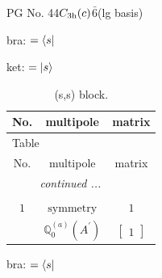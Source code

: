 \documentclass[fleqn,8pt,landscape]{jsarticle}
\begin{document}
\setcounter{MaxMatrixCols}{32}

\renewcommand{\tablename}{Table~}
\renewcommand{\figurename}{Figure~}
\begin{center}
\LARGE
PG No. 44\quad$C_{\rm 3h}(c)$\quad$\bar{6}$\quad[ hexagonal ] (lg basis)
\end{center}
bra: $=\bra{s}$

\noindent
ket: $=\ket{s}$
\renewcommand{\arraystretch}{1.6}
\begin{longtable}{ccc}
\caption{(s,s) block.}
 \\
 \hline \hline
No. & multipole & matrix \\ \hline \endfirsthead

\multicolumn{2}{l}{\tablename\ \thetable{}} \\
 \hline \hline
No. & multipole & matrix \\ \hline \endhead

 \hline \hline
\multicolumn{2}{r}{\footnotesize\it continued ...} \\ \endfoot

 \hline \hline
\multicolumn{2}{r}{} \\ \endlastfoot

$ 1 $ & $ \text{symmetry} $ & $ 1 $ \\
$  $ & $ \mathbb{Q}_{0}^{(a)}(A^{\prime}) $ & $ \begin{bmatrix} 1 \end{bmatrix} $ \\ \hline
\end{longtable}
bra: $=\bra{s}$
\end{document}
